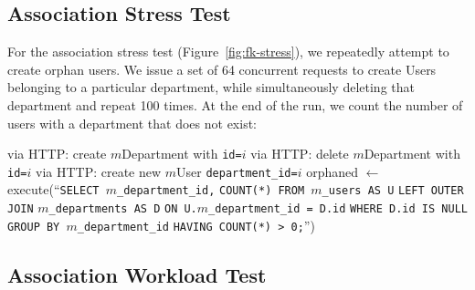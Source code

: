 \subsection{Association Stress Test}
\label{sec:appendix-association-stress}

For the association stress test (Figure~\ref{fig:fk-stress}), we repeatedly attempt to create orphan users. We issue a set of 64 concurrent requests to create Users belonging to a particular department, while simultaneously deleting that department and repeat 100 times. At the end of the run, we count the number of users with a department that does not exist:\vspace{-.5em}
\begin{algorithm}[H]
\begin{algorithmic}

    \State via HTTP: create $m$Department with \texttt{id=$i$}
  \EndFor
        \State via HTTP: delete $m$Department with \texttt{id=$i$}
      \Else
        \State via HTTP: create new $m$User \texttt{department\_id=$i$}
      \EndIf        
     \EndParFor
   \EndFor
   \State orphaned $\gets $execute(``\texttt{SELECT $m$\_department\_id,}
   \State \hspace{8.5em}\texttt{COUNT(*) FROM $m$\_users AS U}
   \State \hspace{8.5em}\texttt{LEFT OUTER JOIN}
   \State \hspace{8.5em}\texttt{$m$\_departments AS D}
   \State \hspace{8.5em}\texttt{ON U.$m$\_department\_id = D.id}
   \State \hspace{8.5em}\texttt{WHERE D.id IS NULL}
   \State \hspace{8.5em}\texttt{GROUP BY $m$\_department\_id}
   \State \hspace{8.5em}\texttt{HAVING COUNT(*) > 0;}'')
\EndFor
\end{algorithmic}
\end{algorithm}

\subsection{Association Workload Test}
\label{sec:appendix-association-workload}

